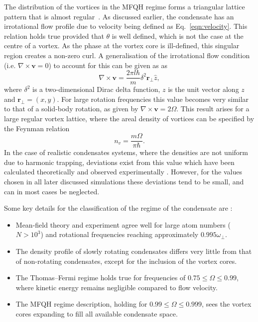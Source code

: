 The distribution of the vortices in the MFQH regime forms a triangular lattice pattern that is almost regular~\cite{Vtx:Schweikhard_prl_2004}. As discussed earlier, the condensate has an irrotational flow profile due to velocity being defined as Eq.~\eqref{eqn:velocity}. This relation holds true provided that $\theta$ is well defined, which is not the case at the centre of a vortex. As the phase at the vortex core is ill-defined, this singular region creates a non-zero curl. A generalisation of the irrotational flow condition (i.e. $\nabla\times \mathbf{v}=0$) to account for this can be given as as~\cite{BK:Pitaevskii_Stringari_2003,BK:Pethick_Smith_2008}
\begin{equation}
    \nabla\times \mathbf{v}=\frac{2\pi l\hbar}{m}\delta^{2}\mathbf{r}_\perp \hat{z},
\end{equation}
where $\delta^2$ is a two-dimensional Dirac delta function, $z$ is the unit vector along $z$ and $\mathbf{r}_\perp=(x,y)$. For large rotation frequencies this value becomes very similar to that of a solid-body rotation, as given by $\nabla \times \mathbf{v}=2\Omega$. This result arises for a large regular vortex lattice, where the areal density of vortices can be specified by the Feynman relation~\cite{BK:Pitaevskii_Stringari_2003}
\begin{equation}\label{eqn:feynman}
n_{v} = \frac{m\Omega}{\pi\hbar}.
\end{equation}
In the case of realistic condensates systems, where the densities are not uniform due to harmonic trapping, deviations exist from this value which have been calculated theoretically \cite{Vtx:Sheey_pra_2004_2,Vtx:Sheey_pra_2004} and observed experimentally \cite{VTX:Coddington_pra_2004}. However, for the values chosen in all later discussed simulations these deviations tend to be small, and can in most cases be neglected.

Some key details for the classification of the regime of the condensate are \cite{BEC:Fetter_revmodphys_2009}:
\begin{itemize}
\item Mean-field theory and experiment agree well for large atom numbers ($N>10^3$) and rotational frequencies reaching approximately $0.995\omega_{\perp}$.
\item The density profile of slowly rotating condensates differs very little from that of non-rotating condensates, except for the inclusion of the vortex cores.
\item The Thomas--Fermi regime holds true for frequencies of $0.75 \leq \Omega \leq 0.99$, where kinetic energy remains negligible compared to flow velocity.
\item The MFQH regime description, holding for $0.99 \leq \Omega \leq 0.999$, sees the vortex cores expanding to fill all available condensate space. %
\end{itemize}

